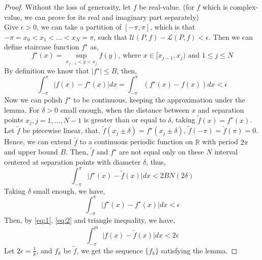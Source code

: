 \documentclass[a4paper]{article}
\numberwithin{equation}{subsection}
\begin{document}
\begin{proof}
    Without the loss of generosity, let $f$ be real-value. (for $f$ which is complex-value, we can prove for its real and imaginary part separately) \\
    Give $\epsilon>0$, we can take a partition of $[-\pi, \pi]$, which is that $-\pi=x_0<x_1<\dots<x_N=\pi$, such that $\mathcal{U}(P, f) - \mathcal{L}(P, f) < \epsilon$. Then we can define staircase function $f^\star$ as,
    \begin{equation}
        f^\star(x) = \sup_{x_{j-1} < y < x_j} f(y) \text{, where } x\in [x_{j-1}, x_j) \text{ and } 1\leq j\leq N
    \end{equation}
    By definition we know that $\lvert f^\star \rvert \leq B$, then,
    \begin{equation}
        \label{eq:1}
        \int_{-\pi}^{\pi} \lvert f(x) - f^\star(x) \rvert dx = \int_{-\pi}^{\pi} ( f^\star(x) - f(x) ) dx < \epsilon
    \end{equation}
    Now we can polish $f^\star$ to be continuous, keeping the approximation under the lemma. For $\delta>0$ small enough, when the distance between $x$ and separation points $x_j, j=1,\dots,N-1$ is greater than or equal to $\delta$, taking $\tilde{f}(x) = f^\star(x)$. Let $\tilde{f}$ be piecewise linear, that, $\tilde{f}(x_j \pm \delta)=f^\star (x_j \pm \delta)$, $\tilde{f}(-\pi) = \tilde{f}(\pi) = 0$. \\
    Hence, we can extend $\tilde{f}$ to a continuous periodic function on $\mathbb{R}$ with period $2\pi$ and upper bound $B$. Then, $\tilde{f}$ and $f^\star$ are not equal only on these $N$ interval centered at separation points with diameter $\delta$, thus,
    \begin{equation}
        \int_{-\pi}^{\pi} \lvert f^\star(x) - \tilde{f}(x) \rvert dx < 2BN(2\delta)
    \end{equation}
    Taking $\delta$ small enough, we have,
    \begin{equation}
        \label{eq:2}
        \int_{-\pi}^{\pi} \lvert f^\star(x) - f^\star(x) \rvert dx < \epsilon
    \end{equation}
    Then, by \cref{eq:1}, \cref{eq:2} and triangle inequality, we have,
    \begin{equation}
        \int_{-\pi}^{pi} \lvert f(x)-\tilde{f}(x) \rvert dx < 2\epsilon
    \end{equation}
    Let $2\epsilon = \frac{1}{k}$, and $f_k$ be $\tilde{f}$, we get the sequence $\{f_k\}$ satisfying the lemma.
\end{proof}
\end{document}
